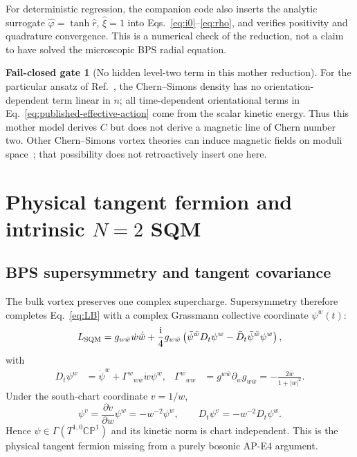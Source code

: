 \documentclass[11pt]{article}
\theoremstyle{definition}
\newtheorem{gate}[theorem]{Fail-closed gate}
\theoremstyle{remark}
\newcommand{\ii}{\mathrm i}
\newcommand{\CP}{\mathbb {CP}}
\begin{document}
For deterministic regression, the companion code also inserts the analytic
surrogate \(\hat\varphi=\tanh\hat r\), \(\hat\xi=1\) into
Eqs.~\eqref{eq:i0}--\eqref{eq:rho}, and verifies positivity and quadrature
convergence.  This is a numerical check of the reduction, not a claim to
have solved the microscopic BPS radial equation.

\begin{gate}[No hidden level-two term in this mother reduction]
For the particular ansatz of Ref.~\cite{AldrovandiSchaposnik2007APE4SQM},
the Chern--Simons density has no orientation-dependent term linear in
\(\dot n\); all time-dependent orientational terms in
Eq.~\eqref{eq:published-effective-action} come from the scalar kinetic
energy.  Thus this mother model derives \(C\) but does not derive a magnetic
line of Chern number two.  Other Chern--Simons vortex theories can induce
magnetic fields on moduli space~\cite{CollieTong2008APE4SQM}; that possibility
does not retroactively insert one here.
\end{gate}

\section{Physical tangent fermion and intrinsic \texorpdfstring{\(N=2\)}{N=2} SQM}

\subsection{BPS supersymmetry and tangent covariance}

The bulk vortex preserves one complex supercharge.  Supersymmetry therefore
completes Eq.~\eqref{eq:LB} with a complex Grassmann collective coordinate
\(\psi^w(t)\):
\begin{equation}
 L_{\rm SQM}=g_{w\bar w}\dot w\dot{\bar w}
 +\frac{\ii}{4}g_{w\bar w}
 \left(\bar\psi^{\bar w}D_t\psi^w-
 \bar D_t\bar\psi^{\bar w}\psi^w\right),
 \label{eq:sqm-action}
\end{equation}
with
\begin{align}
 D_t\psi^w&=\dot\psi^w+\Gamma^w{}_{ww}\dot w\psi^w,
 &\Gamma^w{}_{ww}&=g^{w\bar w}\partial_wg_{w\bar w}
 =-\frac{2\bar w}{1+|w|^2}.
 \label{eq:fermion-connection}
\end{align}
Under the south-chart coordinate \(v=1/w\),
\begin{equation}
 \psi^v=\frac{\partial v}{\partial w}\psi^w=-w^{-2}\psi^w,
 \qquad
 D_t\psi^v=-w^{-2}D_t\psi^w.
 \label{eq:fermion-transition}
\end{equation}
Hence \(\psi\in\Gamma(T^{1,0}\CP^1)\) and its kinetic norm is chart
independent.  This is the physical tangent fermion missing from a purely
bosonic AP-E4 argument.
\end{document}
